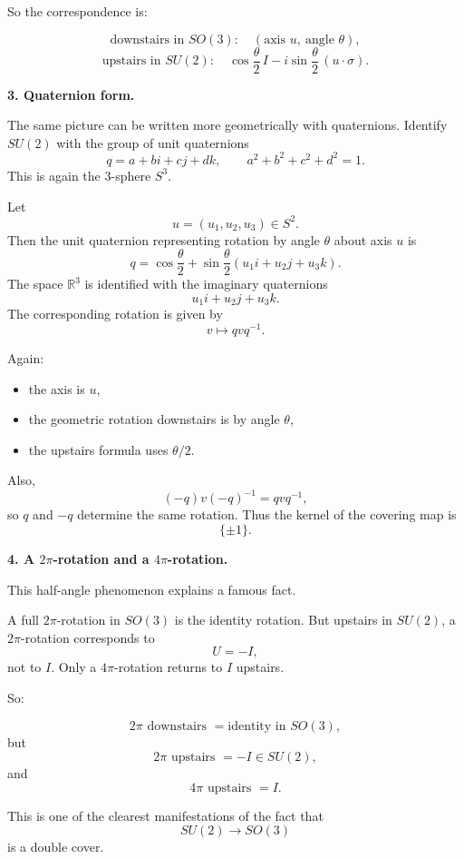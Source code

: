 \documentclass[12pt,a4paper]{article}
\theoremstyle{notespace}
\begin{document}
So the correspondence is:

\[
\text{downstairs in }SO(3):
\quad
(\text{axis }u,\ \text{angle }\theta),
\]
\[
\text{upstairs in }SU(2):
\quad
\cos\frac{\theta}{2}\,I
-
i\sin\frac{\theta}{2}\,(u\cdot \sigma).
\]

\medskip

\textbf{3. Quaternion form.}

The same picture can be written more geometrically with quaternions. Identify \(SU(2)\) with the group of unit quaternions
\[
q=a+bi+cj+dk,
\qquad
a^2+b^2+c^2+d^2=1.
\]
This is again the \(3\)-sphere \(S^3\).

Let
\[
u=(u_1,u_2,u_3)\in S^2.
\]
Then the unit quaternion representing rotation by angle \(\theta\) about axis \(u\) is
\[
q=
\cos\frac{\theta}{2}
+
\sin\frac{\theta}{2}(u_1 i+u_2 j+u_3 k).
\]
The space \(\mathbb R^3\) is identified with the imaginary quaternions
\[
u_1 i+u_2 j+u_3 k.
\]
The corresponding rotation is given by
\[
v\longmapsto qvq^{-1}.
\]

Again:

\begin{itemize}
	\item the axis is \(u\),
	\item the geometric rotation downstairs is by angle \(\theta\),
	\item the upstairs formula uses \(\theta/2\).
\end{itemize}

Also,
\[
(-q)v(-q)^{-1}=qvq^{-1},
\]
so \(q\) and \(-q\) determine the same rotation. Thus the kernel of the covering map is
\[
\{\pm 1\}.
\]

\medskip

\textbf{4. A \(2\pi\)-rotation and a \(4\pi\)-rotation.}

This half-angle phenomenon explains a famous fact.

A full \(2\pi\)-rotation in \(SO(3)\) is the identity rotation. But upstairs in \(SU(2)\), a \(2\pi\)-rotation corresponds to
\[
U=-I,
\]
not to \(I\). Only a \(4\pi\)-rotation returns to \(I\) upstairs.

So:

\[
2\pi \text{ downstairs } = \text{identity in }SO(3),
\]
but
\[
2\pi \text{ upstairs } = -I \in SU(2),
\]
and
\[
4\pi \text{ upstairs } = I.
\]

This is one of the clearest manifestations of the fact that
\[
SU(2)\to SO(3)
\]
is a double cover.

\medskip
\end{document}
